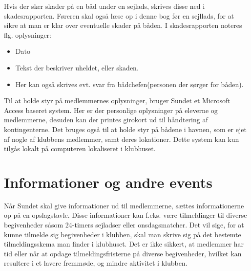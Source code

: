 Hvis der sker skader på en båd under en sejlads, skrives disse ned i skadesrapporten. 
Føreren skal også læse op i denne bog før en sejllads, for at sikre at man er klar over eventuelle skader på båden.
I skadesrapporten noteres flg. oplysninger:

\begin{itemize}
	\item Dato
	\item Tekst der beskriver uheldet, eller skaden.
	\item Her kan også skrives evt. svar fra bådchefen(personen der sørger for båden).
\end{itemize}

Til at holde styr på medlemmernes oplysninger, bruger Sundet et Microsoft Access baseret system. Her er der personlige oplysninger på eleverne og medlemmerne, desuden kan der printes girokort ud til håndtering af kontingenterne. Det bruges også til at holde styr på bådene i havnen, som er ejet af nogle af klubbens medlemmer, samt deres lokationer. Dette system kan kun tilgås lokalt på computeren lokaliseret i klubhuset.

\section{Informationer og andre events}

Når Sundet skal give informationer ud til medlemmerne, sættes informationerne op på en opslagstavle.
Disse informationer kan f.eks. være tilmeldinger til diverse begivenheder såsom 24-timers sejladser eller onsdagsmatcher. 
Det vil sige, for at kunne tilmelde sig begivenheder i klubben, skal man skrive sig på det bestemte tilmeldingsskema man finder i klubhuset. 
Det er ikke sikkert, at medlemmer har tid eller når at opdage tilmeldingsfristerne på diverse begivenheder, hvilket kan resultere i et lavere fremmøde, og mindre aktivitet i klubben.
